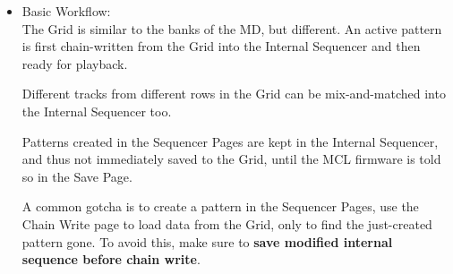 \begin{itemize}
\item Basic Workflow:\\
The Grid is similar to the banks of the MD, but different. An active pattern is first chain-written from the Grid into the Internal Sequencer and then ready for playback. 

Different tracks from different rows in the Grid can be mix-and-matched into the Internal Sequencer too.

Patterns created in the Sequencer Pages are kept in the Internal Sequencer, and thus not immediately saved to the Grid, until the MCL firmware is told so in the Save Page. 

A common gotcha is to create a pattern in the Sequencer Pages, use the Chain Write page to load data from the Grid, only to find the just-created pattern gone. To avoid this, make sure to \textbf{save modified internal sequence before chain write}.

\end{itemize}


